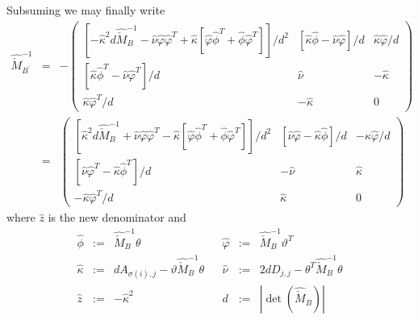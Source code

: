 \documentclass[a4paper]{article}
\begin{document}
Subsuming we may finally write
\begin{eqnarray}
\label{def:update_Z3}
\hat{\check{M}}_{B^{\prime}}^{-1}
&=&
-
\left(
\begin{array}{c|c|c}
\left[
  -\hat{\kappa}^{2}d\hat{\check{M}}_{B}^{-1}
  -\hat{\nu}\hat{\varphi}\hat{\varphi}^{T}
  +\hat{\kappa}
  \left[
    \hat{\varphi}\hat{\phi}^{T}+\hat{\phi}\hat{\varphi}^{T}
  \right]
\right] / d^{2}
&
\left[
  \hat{\kappa}\hat{\phi} - \hat{\nu}\hat{\varphi}
\right] /d
&
  \hat{\kappa}\hat{\varphi} / d
\\
\hline
\left[
  \hat{\kappa}\hat{\phi}^{T} - \hat{\nu}\hat{\varphi}^{T}
\right] /d
&
\hat{\nu}
&
-\hat{\kappa}
\\
\hline
\hat{\kappa}\hat{\varphi}^{T} /d
&
-\hat{\kappa}
&
0
\end{array}
\right)
\nonumber \\
&=&
\left(
\begin{array}{c|c|c}
\left[
  \hat{\kappa}^{2}d\hat{\check{M}}_{B}^{-1}
  +\hat{\nu}\hat{\varphi}\hat{\varphi}^{T}
  -\hat{\kappa}
  \left[
    \hat{\varphi}\hat{\phi}^{T}+\hat{\phi}\hat{\varphi}^{T}
  \right]
\right] / d^{2}
&
\left[
  \hat{\nu}\hat{\varphi} - \hat{\kappa}\hat{\phi}
\right] /d
&
-\hat{\kappa}\hat{\varphi} / d
\\
\hline
\left[
  \hat{\nu}\hat{\varphi}^{T} - \hat{\kappa}\hat{\phi}^{T}
\right] /d
&
-\hat{\nu}
&
\hat{\kappa}
\\
\hline
-\hat{\kappa}\hat{\varphi}^{T} /d
&
\hat{\kappa}
&
0
\end{array}
\right)
\end{eqnarray}
where $\hat{z}$ is the new denominator and 
\begin{equation}
\label{def:update_Z3_entities}
\begin{array}{rclcrcl}
\hat{\phi} &:=& \hat{\check{M}}_{B}^{-1}\theta
&&
\hat{\varphi} &:=& \hat{\check{M}}_{B}^{-1}\vartheta^{T}
\\
\hat{\kappa} &:=& dA_{\sigma(i), j}-\vartheta\hat{\check{M}}_{B}^{-1}\theta
&&
\hat{\nu} &:=& 2dD_{j,j}-\theta^{T}\hat{\check{M}}_{B}^{-1}\theta
\\
\hat{z} &:=& -\hat{\kappa}^{2}
&&
d &:=& \left|\det(\hat{\check{M}}_{B})\right|
\end{array}
\end{equation}
\end{document}
